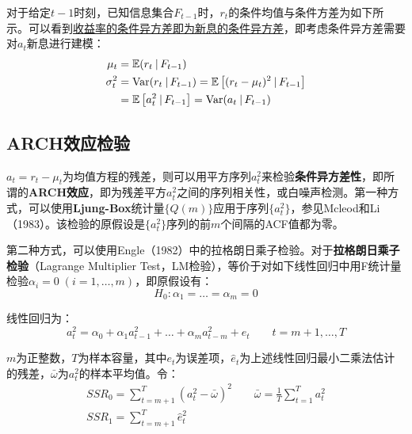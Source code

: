 \documentclass[11pt]{article}
\begin{document}
对于给定$t-1$时刻，已知信息集合$F_{t-1}$时，$r_t$的条件均值与条件方差为如下所示。可以看到\uline{收益率的条件异方差即为新息的条件异方差}，即考虑条件异方差需要对$a_t$新息进行建模：
\begin{align*}
    \mu_t &= \mathbb{E}(r_t \:\vert\, F_{t-1}) \\
    \sigma_{t}^{2} &= \operatorname{Var}(r_t \:\vert\, F_{t-1})
    = \mathbb{E} \left[ (r_t - \mu_t)^2 \:\vert\, F_{t-1} \right] \\
    &= \mathbb{E} \left[ a_{t}^{2} \:\vert\, F_{t-1} \right]
    = \operatorname{Var}(a_t \:\vert\, F_{t-1})
\end{align*}


\subsection{ARCH效应检验}

$a_t = r_t - \mu_t$为均值方程的残差，则可以用平方序列$a_t^2$来检验\textbf{条件异方差性}，即所谓的\textbf{ARCH效应}，即为残差平方$a_t^2$之间的序列相关性，或白噪声检测。第一种方式，可以使用\textbf{Ljung-Box}统计量$\{Q(m)\}$应用于序列$\{a_t^2\}$，参见Mcleod和Li（1983）。该检验的原假设是$\{a_t^2\}$序列的前$m$个间隔的ACF值都为零。

第二种方式，可以使用Engle（1982）中的拉格朗日乘子检验。对于\textbf{拉格朗日乘子检验}（Lagrange Multiplier Test，LM检验），等价于对如下线性回归中用F统计量检验$\alpha_i=0\;(i=1,\dots,m)$，即原假设有：
\begin{equation*}
    H_0: \alpha_1 = \dots = \alpha_m = 0
\end{equation*}

线性回归为：
\begin{equation*}
    a^2_t = \alpha_0 + \alpha_1 a^{2}_{t-1} + \dots + \alpha_m a^{2}_{t-m} + e_t \qquad t=m+1,\dots,T
\end{equation*}

$m$为正整数，$T$为样本容量，其中$e_t$为误差项，$\hat{e}_t$为上述线性回归最小二乘法估计的残差，$\bar{\omega}$为$a_t^2$的样本平均值。令：
\begin{gather*}
    SSR_0 = \sum_{t=m+1}^{T} (a_t^2 - \bar{\omega})^2 \qquad
    \bar{\omega} = \frac{1}{T} \sum_{t=1}^{T} a_t^2 \\
    SSR_1 = \sum_{t=m+1}^{T} \hat{e}_t^2
\end{gather*}
\end{document}
